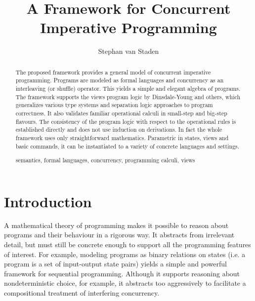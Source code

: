 \documentclass[a4paper,leqno]{llncs}
\newcommand{\keywords}[1]{\par\addvspace\baselineskip
\noindent\keywordname\enspace\ignorespaces#1}
\begin{document}
\mainmatter

\title{A Framework for Concurrent Imperative Programming}


\author{Stephan van Staden}




\maketitle

\begin{abstract}
The proposed framework provides a general model of concurrent imperative programming. Programs are modeled as formal languages and concurrency as an interleaving (or shuffle) operator. This yields a simple and elegant algebra of programs. The framework supports the views program logic by Dinsdale-Young and others, which generalizes various type systems and separation logic approaches to program correctness. It also validates familiar operational calculi in small-step and big-step flavours. The consistency of the program logic with respect to the operational rules is established directly and does not use induction on derivations. In fact the whole framework uses only straightforward mathematics. Parametric in states, views and basic commands, it can be instantiated to a variety of concrete languages and settings.
\keywords{semantics, formal languages, concurrency, programming calculi, views}
\end{abstract}

\section{Introduction}
A mathematical theory of programming makes it possible to reason about programs and their behaviour in a rigorous way. It abstracts from irrelevant detail, but must still be concrete enough to support all the programming features of interest. For example, modeling programs as binary relations on states (i.e. a program is a set of input-output state pairs) yields a simple and powerful framework for sequential programming. Although it supports reasoning about nondeterministic choice, for example, it abstracts too aggressively to facilitate a compositional treatment of interfering concurrency.
\end{document}
